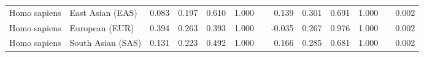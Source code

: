 \begin{center}
\begin{adjustbox}{width = 1\textwidth}
\begin{tabular}{|l|l|r|r|r|r|r|r|r|r|r|}
        Homo sapiens &                East Asian (EAS) &                 0.083 &                                0.197 &                0.610 &                                  1.000~~ &                 0.139 &                                0.301 &                0.691 &                                  1.000~~ &              0.002 \\
        Homo sapiens &                  European (EUR) &                 0.394 &                                0.263 &                0.393 &                                  1.000~~ &                -0.035 &                                0.267 &                0.976 &                                  1.000~~ &              0.002 \\
        Homo sapiens &               South Asian (SAS) &                 0.131 &                                0.223 &                0.492 &                                  1.000~~ &                 0.166 &                                0.285 &                0.681 &                                  1.000~~ &              0.002 \\
\bottomrule
\end{tabular}
\end{adjustbox}
\end{center}
\newpage
